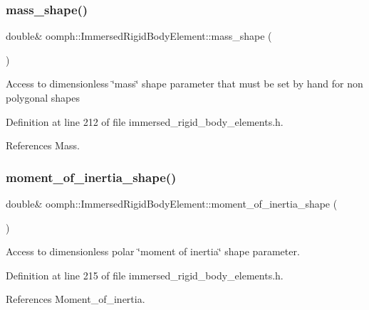 \subsubsection{\texorpdfstring{mass\+\_\+shape()}{mass\_shape()}}
{\footnotesize\ttfamily double\& oomph\+::\+Immersed\+Rigid\+Body\+Element\+::mass\+\_\+shape (\begin{DoxyParamCaption}{ }\end{DoxyParamCaption})\hspace{0.3cm}{\ttfamily [inline]}}

Access to dimensionless \char`\"{}mass\char`\"{} shape parameter that must be set by hand for non polygonal shapes 

Definition at line 212 of file immersed\+\_\+rigid\+\_\+body\+\_\+elements.\+h.



References Mass.

\mbox{\label{classoomph_1_1ImmersedRigidBodyElement_ac55d720f7151e838785bcca455127155}} 
\subsubsection{\texorpdfstring{moment\+\_\+of\+\_\+inertia\+\_\+shape()}{moment\_of\_inertia\_shape()}}
{\footnotesize\ttfamily double\& oomph\+::\+Immersed\+Rigid\+Body\+Element\+::moment\+\_\+of\+\_\+inertia\+\_\+shape (\begin{DoxyParamCaption}{ }\end{DoxyParamCaption})\hspace{0.3cm}{\ttfamily [inline]}}



Access to dimensionless polar \char`\"{}moment of inertia\char`\"{} shape parameter. 



Definition at line 215 of file immersed\+\_\+rigid\+\_\+body\+\_\+elements.\+h.



References Moment\+\_\+of\+\_\+inertia.

\mbox{\label{classoomph_1_1ImmersedRigidBodyElement_a4c5bf4b09a19ea70edf9ec68b41bfd2a}} 
